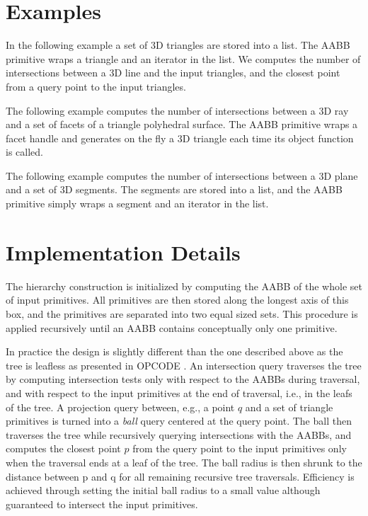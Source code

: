 \section{Examples}
\label{AABB_tree_section_examples}

In the following example a set of 3D triangles are stored into a list. The AABB primitive wraps a triangle and an iterator in the list. We computes the number of intersections between a 3D line and the input triangles, and the closest point from a query point to the input triangles.

The following example computes the number of intersections between a 3D ray and a set of facets of a triangle polyhedral surface. The AABB primitive wraps a facet handle and generates on the fly a 3D triangle each time its object function is called.

The following example computes the number of intersections between a 3D plane and a set of 3D segments. The segments are stored into a list, and the AABB primitive simply wraps a segment and an iterator in the list.

\section{Implementation Details}
\label{AABB_tree_section_intro}

The hierarchy construction is initialized by computing the AABB of the whole set of input primitives. All primitives are then stored along the longest axis of this box, and the primitives are separated into two equal sized sets. This procedure is applied recursively until an AABB contains conceptually only one primitive. 

In practice the design is slightly different than the one described above as the tree is leafless as presented in OPCODE \cite{opcode}. An intersection query traverses the tree by computing intersection tests only with respect to the AABBs during traversal, and with respect to the input primitives at the end of traversal, i.e., in the leafs of the tree. A projection query between, e.g., a point $q$ and a set of triangle primitives is turned into a \emph{ball} query centered at the query point. The ball then traverses the tree while recursively querying intersections with the AABBs, and computes the closest point $p$ from the query point to the input primitives only when the traversal ends at a leaf of the tree. The ball radius is then shrunk to the distance between p and q for all remaining recursive tree traversals. Efficiency is achieved through setting the initial ball radius to a small value although guaranteed to intersect the input primitives.
